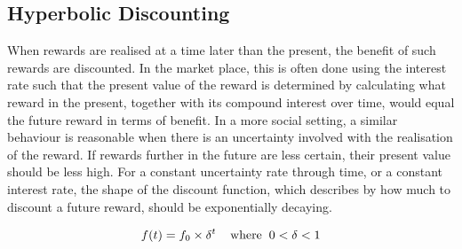 \documentclass[a4paper,10pt]{article}
\numberwithin{equation}{section}
\begin{document}
\subsection{Hyperbolic Discounting}
\label{sec:Hyperbolic Discounting}

When rewards are realised at a time later than the present, the benefit of such rewards are discounted. In the market place, this is often done using the interest rate such that the present value of the reward is determined by calculating what reward in the present, together with its compound interest over time, would equal the future reward in terms of benefit. In a more social setting, a similar behaviour is reasonable when there is an uncertainty involved with the realisation of the reward. If rewards further in the future are less certain, their present value should be less high. For a constant uncertainty rate through time, or a constant interest rate, the shape of the discount function, which describes by how much to discount a future reward, should be exponentially decaying.

\begin{equation}
\label{eq:myExponential}
f(t) = f_0 \times \delta^{t} \hspace{.4cm} \text{where} \hspace{.2cm} 0<\delta<1
\end{equation}\\
\end{document}
